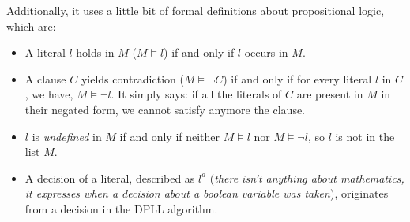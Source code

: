 Additionally, it uses a little bit of formal definitions about propositional logic, which are:
\begin{itemize}
    \renewcommand{\labelitemi}{-}
    \item A literal $l$ holds in $M$ ($M \models l$) if and only if $l$ occurs in $M$.
    \item A clause $C$ yields contradiction ($M \models \neg C$) if and only if for every literal $l$ in $C$, we have, $M \models \neg l$. It simply says: if all the literals of $C$ are present in $M$ in their negated form, we cannot satisfy anymore the clause.
    \item $l$ is \textit{undefined} in $M$ if and only if neither $M \models l$ nor $M \models \neg l$, so $l$ is not in the list $M$.
    \item A decision of a literal, described as $l^d$ (\textit{there isn't anything about mathematics, it expresses when a decision about a boolean variable was taken}), originates from a decision in the DPLL algorithm.
\end{itemize}